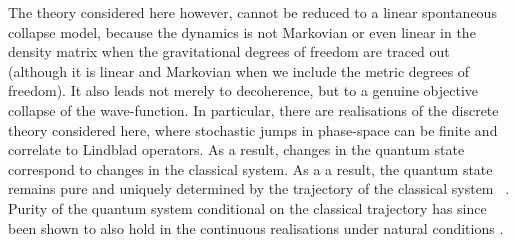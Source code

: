 \documentclass[aps,pra,showpacs,citeautoscript,amsmath,amssymb,floatfix,superscriptaddress,bbm, verbatim,amsfonts,changes,11pt,nofootinbib,longbibliography]{revtex4-2}
\begin{document}
The theory considered here however, cannot be reduced to a linear spontaneous collapse model, because the dynamics is not Markovian or even linear in the density matrix when the gravitational degrees of freedom are traced out (although it is linear and Markovian when we include the metric degrees of freedom). It also leads not merely to decoherence, but
to a genuine objective collapse of the wave-function.
In particular, there are realisations of the discrete theory considered here, where stochastic jumps in phase-space can be finite and correlate to Lindblad operators. As a result, changes in the quantum state correspond to changes in the classical system. As a a result, the quantum state remains pure and uniquely determined by the trajectory of the classical system~ \cite{UCLqubit}. Purity of the quantum system conditional on the classical trajectory has since been shown to also hold in the continuous realisations under natural conditions \cite{layton2022semi}. 
\end{document}
